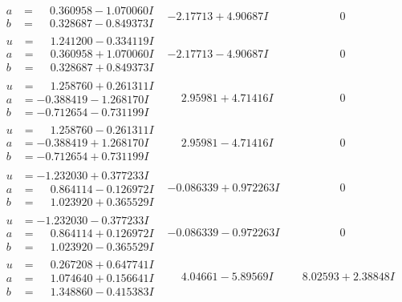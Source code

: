 \documentclass[1p]{elsarticle_modified}
\theoremstyle{definition}
\begin{document}
$$\begin{array}{c|c|c}
\begin{aligned}
a &= \phantom{-}0.360958 - 1.070060 I \\
b &= \phantom{-}0.328687 - 0.849373 I\end{aligned}
 & -2.17713 + 4.90687 I & \phantom{-0.000000 } 0 \\ \hline\begin{aligned}
u &= \phantom{-}1.241200 - 0.334119 I \\
a &= \phantom{-}0.360958 + 1.070060 I \\
b &= \phantom{-}0.328687 + 0.849373 I\end{aligned}
 & -2.17713 - 4.90687 I & \phantom{-0.000000 } 0 \\ \hline\begin{aligned}
u &= \phantom{-}1.258760 + 0.261311 I \\
a &= -0.388419 - 1.268170 I \\
b &= -0.712654 - 0.731199 I\end{aligned}
 & \phantom{-}2.95981 + 4.71416 I & \phantom{-0.000000 } 0 \\ \hline\begin{aligned}
u &= \phantom{-}1.258760 - 0.261311 I \\
a &= -0.388419 + 1.268170 I \\
b &= -0.712654 + 0.731199 I\end{aligned}
 & \phantom{-}2.95981 - 4.71416 I & \phantom{-0.000000 } 0 \\ \hline\begin{aligned}
u &= -1.232030 + 0.377233 I \\
a &= \phantom{-}0.864114 - 0.126972 I \\
b &= \phantom{-}1.023920 + 0.365529 I\end{aligned}
 & -0.086339 + 0.972263 I & \phantom{-0.000000 } 0 \\ \hline\begin{aligned}
u &= -1.232030 - 0.377233 I \\
a &= \phantom{-}0.864114 + 0.126972 I \\
b &= \phantom{-}1.023920 - 0.365529 I\end{aligned}
 & -0.086339 - 0.972263 I & \phantom{-0.000000 } 0 \\ \hline\begin{aligned}
u &= \phantom{-}0.267208 + 0.647741 I \\
a &= \phantom{-}1.074640 + 0.156641 I \\
b &= \phantom{-}1.348860 - 0.415383 I\end{aligned}
 & \phantom{-}4.04661 - 5.89569 I & \phantom{-}8.02593 + 2.38848 I\\

\end{array}$$
\end{document}
